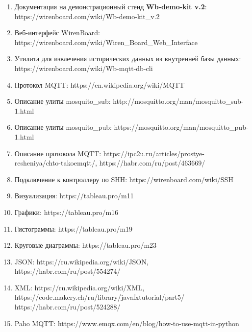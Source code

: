 \documentclass[a4paper,14pt]{extarticle}
\newcommand{\stend}{\textbf{Wb-demo-kit v.2}}
\begin{document}
\begin{enumerate}
	\item Документация на демонстрационный стенд \stend: https://wirenboard.com/wiki/Wb-demo-kit\_v.2
	\item Веб-интерфейс WirenBoard: https://wirenboard.com/wiki/Wiren\_Board\_Web\_Interface
	\item Утилита для извлечения исторических данных из внутренней базы данных:
	https://wirenboard.com/wiki/Wb-mqtt-db-cli
	\item Протокол MQTT: https://en.wikipedia.org/wiki/MQTT
	\item Описание улиты mosquito\_sub: http://mosquitto.org/man/mosquitto\_sub-1.html
	\item Описание улиты mosquito\_pub: https://mosquitto.org/man/mosquitto\_pub-1.html
	\item Описание протокола MQTT: https://ipc2u.ru/articles/prostye-resheniya/chto-takoemqtt/, https://habr.com/ru/post/463669/
	\item Подключение к контроллеру по SHH: https://wirenboard.com/wiki/SSH
	\item Визуализация: https://tableau.pro/m11
	\item Графики: https://tableau.pro/m16
	\item Гистограммы: https://tableau.pro/m19
	\item Круговые диаграммы: https://tableau.pro/m23
	\item JSON: https://ru.wikipedia.org/wiki/JSON, https://habr.com/ru/post/554274/
	\item XML: https://ru.wikipedia.org/wiki/XML, https://code.makery.ch/ru/library/javafxtutorial/part5/ https://habr.com/ru/post/524288/
	\item Paho MQTT: https://www.emqx.com/en/blog/how-to-use-mqtt-in-python
\end{enumerate}
\end{document}
